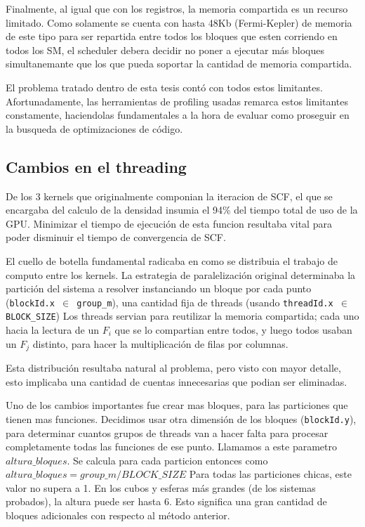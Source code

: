 Finalmente, al igual que con los registros, la memoria compartida es un recurso limitado. Como
solamente se cuenta con hasta 48Kb (Fermi-Kepler) de memoria de este tipo para ser repartida entre
todos los bloques que esten corriendo en todos los SM, el scheduler debera decidir no poner a ejecutar
m\'as bloques simultanemante que los que pueda soportar la cantidad de memoria compartida.

El problema tratado dentro de esta tesis cont\'o con todos estos limitantes. Afortunadamente,
las herramientas de profiling usadas remarca estos limitantes constamente, haciendolas
fundamentales a la hora de evaluar como proseguir en la busqueda de optimizaciones de c\'odigo.

\subsection{Cambios en el threading}
De los 3 kernels que originalmente componian la iteracion de SCF, el que se encargaba
del calculo de la densidad insumia el 94\% del tiempo total de uso de la GPU. Minimizar
el tiempo de ejecuci\'on de esta funcion resultaba vital para poder disminuir el tiempo
de convergencia de SCF.

El cuello de botella fundamental radicaba en como se distribuia el trabajo de computo
entre los kernels. La estrategia de paralelizaci\'on original determinaba la partici\'on
del sistema a resolver instanciando un bloque por cada punto (\texttt{blockId.x $\in$ group\_m}),
una cantidad fija de threads (usando \texttt{threadId.x $\in$ BLOCK\_SIZE})
Los threads servian para reutilizar la memoria compartida; cada uno hacia la lectura
de un $F_i$ que se lo compartian entre todos, y luego todos usaban un $F_j$ distinto, para
hacer la multiplicaci\'on de filas por columnas.

Esta distribuci\'on resultaba natural al problema, pero visto con mayor detalle, esto
implicaba una cantidad de cuentas innecesarias que podian ser eliminadas.

Uno de los cambios importantes fue crear mas bloques, para las particiones que tienen
mas funciones. Decidimos usar otra dimensi\'on de los bloques (\texttt{blockId.y}),
para determinar cuantos grupos de threads van a hacer falta para procesar completamente
todas las funciones de ese punto. Llamamos a este parametro $altura\_bloques$. Se
calcula para cada particion entonces como $altura\_bloques = {group\_m}/{BLOCK\_SIZE}$
Para todas las particiones chicas, este valor no supera a 1. En los cubos y esferas m\'as
grandes (de los sistemas probados), la altura puede ser hasta 6. Esto significa una gran
cantidad de bloques adicionales con respecto al m\'etodo anterior.

